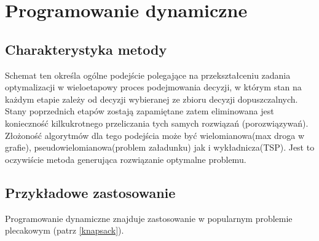 \section{Programowanie dynamiczne}
	\subsection{Charakterystyka metody}

		Schemat ten określa ogólne podejście polegające na przekształceniu zadania
		optymalizacji w wieloetapowy proces podejmowania decyzji, w którym
		stan na każdym etapie zależy od decyzji wybieranej ze zbioru decyzji dopuszczalnych.
		Stany poprzednich etapów
		zostają zapamiętane zatem eliminowana jest konieczność kilkukrotnego przeliczania tych 
		samych rozwiązań (porozwiązywań). Złożoność algorytmów dla tego podejścia może być 
		wielomianowa(max droga w grafie), pseudowielomianowa(problem załadunku) 
		jak i wykładnicza(TSP).
		Jest to oczywiście metoda generująca rozwiązanie optymalne problemu.
		
	\subsection{Przykładowe zastosowanie}
	
		Programowanie dynamiczne znajduje zastosowanie w popularnym problemie plecakowym 
		(patrz \ref{knapsack}).
		